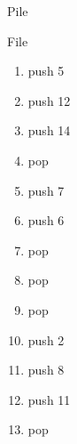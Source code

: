 \documentclass[11pt,a4paper]{article}
\begin{document}
\begin{center}

\begin{table}[ht!]
  \centering
  \begin{minipage}{0.5\textwidth}
    \centering
Pile

  \end{minipage}
  \hfillx
  \begin{minipage}{0.5\textwidth}
    \centering

File

  \end{minipage}
\end{table}



\begin{table}[ht!]
  \centering
  \begin{minipage}{0.25\textwidth}
    \centering

\begin{enumerate}[label=\roman*]
\item push 5
\item push 12
\item push 14
\item pop
\item push 7
\item push 6
\item pop
\item pop
\end{enumerate}

\vspace*{2cm}

  \end{minipage}
  \hfillx
  \begin{minipage}{0.25\textwidth}

\begin{enumerate}[label=\roman*]
\setcounter{enumi}{8}
\item pop
\item push 2
\item push 8
\item push 11
\item pop
\end{enumerate}

\vspace*{1.75cm}

\vspace*{2cm}

  \end{minipage}
  \hfillx
  \begin{minipage}{0.01\textwidth}


\end{minipage}
\end{table}
\end{center}
\end{document}
